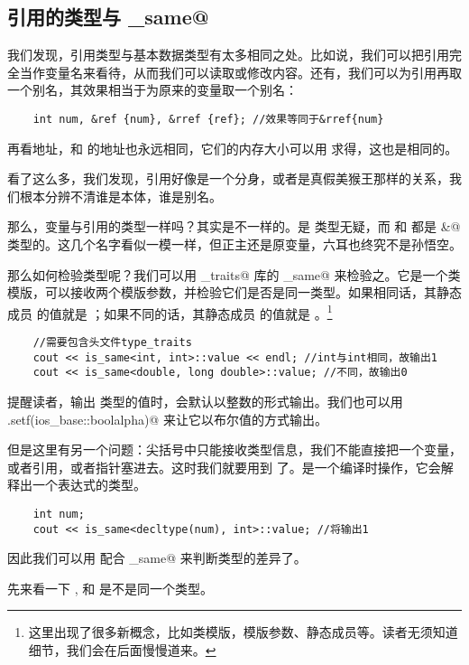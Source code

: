 \subsection*{引用的类型与 \lstinline@is_same@}
我们发现，引用类型与基本数据类型有太多相同之处。比如说，我们可以把引用完全当作变量名来看待，从而我们可以读取或修改内容。还有，我们可以为引用再取一个别名，其效果相当于为原来的变量取一个别名：
\begin{lstlisting}
    int num, &ref {num}, &rref {ref}; //效果等同于&rref{num}
\end{lstlisting}
再看地址，\lstinline@num@ 和 \lstinline@ref@ 的地址也永远相同，它们的内存大小可以用 \lstinline@sizeof@ 求得，这也是相同的。\par
看了这么多，我们发现，引用好像是一个分身，或者是真假美猴王那样的关系，我们根本分辨不清谁是本体，谁是别名。\par
那么，变量与引用的类型一样吗？其实是不一样的。\lstinline@num@ 是 \lstinline@int@ 类型无疑，而 \lstinline@ref@ 和 \lstinline@rref@ 都是 \lstinline@int&@ 类型的。这几个名字看似一模一样，但正主还是原变量，六耳也终究不是孙悟空。\par
那么如何检验类型呢？我们可以用 \lstinline@type_traits@ 库的 \lstinline@is_same@ 来检验之。它是一个类模版，可以接收两个模版参数，并检验它们是否是同一类型。如果相同话，其静态成员 \lstinline@value@ 的值就是 \lstinline@true@；如果不同的话，其静态成员 \lstinline@value@ 的值就是 \lstinline@false@。\footnote{这里出现了很多新概念，比如类模版，模版参数、静态成员等。读者无须知道细节，我们会在后面慢慢道来。}
\begin{lstlisting}
    //需要包含头文件type_traits
    cout << is_same<int, int>::value << endl; //int与int相同，故输出1
    cout << is_same<double, long double>::value; //不同，故输出0
\end{lstlisting}
提醒读者，\lstinline@cout@ 输出 \lstinline@bool@ 类型的值时，会默认以整数的形式输出。我们也可以用 \lstinline@cout.setf(ios_base::boolalpha)@ 来让它以布尔值的方式输出。\par
但是这里有另一个问题：尖括号中只能接收类型信息，我们不能直接把一个变量，或者引用，或者指针塞进去。这时我们就要用到 \lstinline@decltype@ 了。\lstinline@decltype@ 是一个编译时操作，它会解释出一个表达式的类型。
\begin{lstlisting}
    int num;
    cout << is_same<decltype(num), int>::value; //将输出1
\end{lstlisting}
因此我们可以用 \lstinline@decltype@ 配合 \lstinline@is_same@ 来判断类型的差异了。\par
先来看一下 \lstinline@num@, \lstinline@ref@ 和 \lstinline@rref@ 是不是同一个类型。
